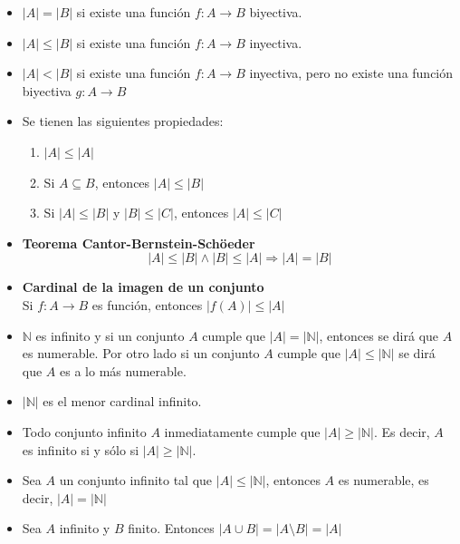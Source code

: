 \documentclass[letterpaper,11pt]{article}
\newcommand{\N}{\mathbb N}
\theoremstyle{plain}
\begin{document}
\begin{framed}
	\begin{multicols}{2}
	    \begin{itemize}  
    \item $|A|=|B|$ si existe una función $f:A\to B$ biyectiva.
    
    \item $|A|\leq|B|$ si existe una función $f:A \to B$ inyectiva.
    
    \item $|A|<|B|$ si existe una función $f:A\to B$ inyectiva, pero no existe una función biyectiva $g:A \to B$
    
    \item Se tienen las siguientes propiedades:
        \begin{enumerate}
            \item $|A|\leq |A|$
            \item Si $A \subseteq B$, entonces $|A|\leq |B|$
            \item Si $|A|\leq |B|$ y $|B|\leq |C|$, entonces $|A|\leq |C|$
        \end{enumerate}
    
    \item \textbf{Teorema Cantor-Bernstein-Schöeder}
    $$|A|\leq |B| \land |B|\leq |A| \Rightarrow  |A|=|B|$$
    
    \item \textbf{Cardinal de la imagen de un conjunto}\\
    Si $f:A \to B$ es función, entonces $|f(A)|\leq |A|$
    
    \item $\N$ es infinito y si un conjunto $A$ cumple que $|A|=|\N|$, entonces se dirá que $A$ es numerable.
    Por otro lado si un conjunto $A$ cumple que $|A| \leq |\N|$ se dirá que $A$ es a lo más numerable.
    
    \item $|\N|$ es el menor cardinal infinito.
    
    \item Todo conjunto infinito $A$ inmediatamente cumple que $|A|\geq |\N|$. Es decir, $A$ es infinito si y sólo si $|A|\geq |\N|$.
    
    \item Sea $A$ un conjunto infinito tal que $|A|\leq |\N|$, entonces $A$ es numerable, es decir, $|A|=|\N|$
    
    \item Sea $A$ infinito y $B$ finito. Entonces $|A\cup B|=|A\setminus B|=|A|$
    

\end{itemize}
\end{multicols}
\end{framed}
\end{document}
